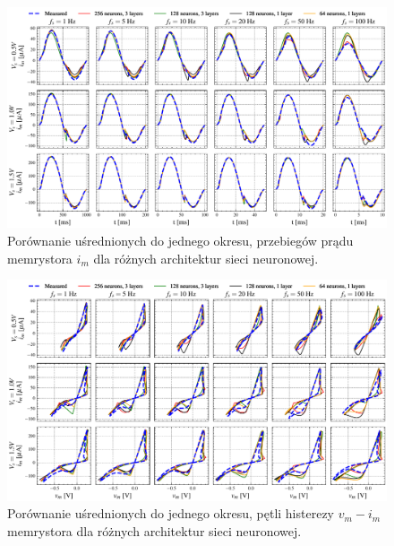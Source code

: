 \documentclass[11pt, oneside]{article}
\begin{document}
\begin{figure}[htbp!]
    \centering
    \includegraphics[width=\linewidth]{sample_results/simulated_ims.pdf}
    \caption{Porównanie uśrednionych do jednego okresu, przebiegów prądu memrystora $i_m$ dla różnych architektur sieci neuronowej.}
\end{figure}


\begin{figure}[htbp!]
    \centering
    \includegraphics[width=\linewidth]{sample_results/simulated_histeresis.pdf}
    \caption{Porównanie uśrednionych do jednego okresu, pętli histerezy $v_m - i_m$ memrystora  dla różnych architektur sieci neuronowej.}
\end{figure}
\end{document}
